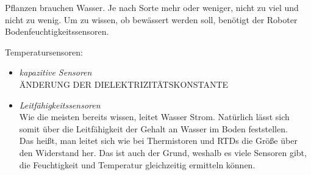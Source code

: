 		Pflanzen brauchen Wasser. Je nach Sorte mehr oder weniger, nicht zu viel und nicht zu wenig. Um zu wissen, ob bewässert werden soll, benötigt der Roboter Bodenfeuchtigkeitssensoren.
		
		\begin{description}
			\item {Temperatursensoren:}
			\begin{itemize}
				\item {\textit{kapazitive Sensoren}}\\
				ÄNDERUNG DER DIELEKTRIZITÄTSKONSTANTE
				
				\cite{induuxwiki2022}
				\item {\textit{Leitfähigkeitssensoren}}\\
				Wie die meisten bereits wissen, leitet Wasser Strom. Natürlich lässt sich somit über die Leitfähigkeit der Gehalt an Wasser im Boden feststellen.\\
				Das heißt, man leitet sich wie bei Thermistoren und RTDs die Größe über den Widerstand her. Das ist auch der Grund, weshalb es viele Sensoren gibt, die Feuchtigkeit und Temperatur gleichzeitig ermitteln können.
			\end{itemize}
		\end{description}
		